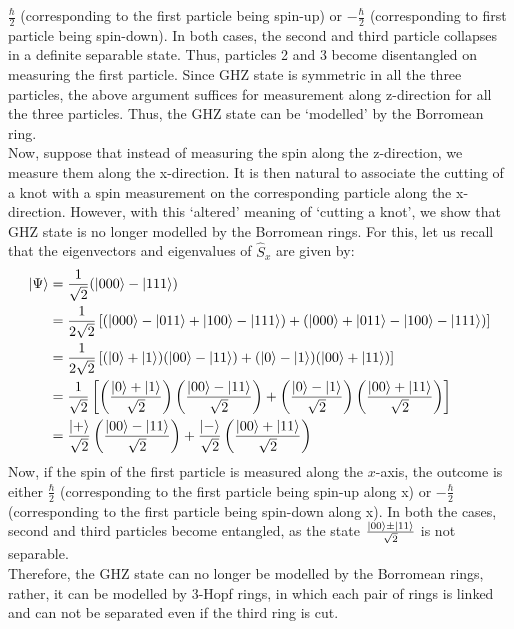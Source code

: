 \documentclass{scrartcl}
\begin{document}
$\frac{\hbar}{2}$ {(corresponding to the first particle being spin-up)} or  $-\frac{\hbar}{2}$ {(corresponding to first particle being  spin-down)}. In both cases, the second and third particle collapses in a definite separable state. Thus, particles 2 and 3 become disentangled on measuring the first particle. Since GHZ state is symmetric in all the three particles, the above argument suffices for measurement along z-direction for all the three particles. Thus, the GHZ state can be `modelled' by the Borromean ring. \\[0.3cm]
Now, suppose that instead of measuring the spin along the z-direction, we measure them along the x-direction. It is then natural to associate the cutting of a knot with a spin measurement on the corresponding particle along the x-direction. However, with this `altered' meaning of `cutting a knot', we show that GHZ state is no longer modelled by the Borromean rings. For this, let us recall that the eigenvectors and eigenvalues of $\hat{S}_x$ are given by:
\begin{align*}
    \ket{\Psi} &= \frac{1}{\sqrt{2}} (\ket{000} - \ket{111}) \\
    &= \frac{1}{2\sqrt{2}} \left[ (\ket{000} - \ket{011} + \ket{100} - \ket{111}) + (\ket{000} + \ket{011} - \ket{100} - \ket{111}) \right] \\
    &= \frac{1}{2\sqrt{2}} \left[ (\ket{0} + \ket{1})(\ket{00} - \ket{11}) + (\ket{0} - \ket{1})(\ket{00} + \ket{11}) \right] \\
    &= \frac{1}{\sqrt{2}} \left[ \left( \frac{\ket{0} + \ket{1}}{\sqrt{2}} \right)\left(  \frac{\ket{00} - \ket{11}}{\sqrt{2}} \right) + \left( \frac{\ket{0} - \ket{1}}{\sqrt{2}} \right) \left( \frac{\ket{00} + \ket{11}}{\sqrt{2}} \right) \right] \\
    &= \frac{\ket{+}}{\sqrt{2}} \left( \frac{\ket{00} - \ket{11}}{\sqrt{2}}  \right)+ \frac{\ket{-}}{\sqrt{2}}\left(  \frac{\ket{00} + \ket{11}}{\sqrt{2}} \right) 
    \end{align*}
Now, if the spin of the first particle is measured along the $x$-axis, the outcome is either $\frac{\hbar}{2}$ (corresponding to the first particle being spin-up along x) or $-\frac{\hbar}{2}$ (corresponding to the first particle being spin-down along x). In both the cases, second and third particles become entangled, as the state $\frac{\ket{00} \pm \ket{11}}{\sqrt{2}}$ is not separable.\\[0.3cm]
Therefore, the GHZ state can no longer be modelled by the Borromean rings, rather, it can be modelled by 3-Hopf rings, in which each pair of rings is linked and can not be separated even if the third ring is cut.
\end{document}
